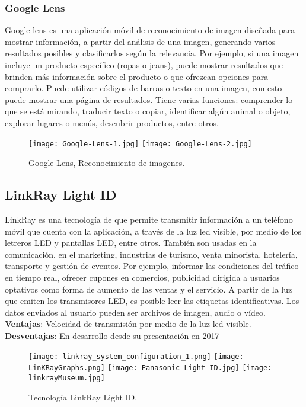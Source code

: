 \subsubsection{Google Lens}
Google lens es una aplicación móvil de reconocimiento de imagen diseñada para mostrar información, a partir del análisis de una imagen, generando varios resultados posibles y clasificarlos según la relevancia. Por ejemplo, si una imagen incluye un producto específico (ropas o jeans), puede mostrar resultados que brinden más información sobre el producto o que ofrezcan opciones para comprarlo. Puede utilizar códigos de barras o texto en una imagen, con esto puede mostrar una página de resultados. Tiene varias funciones: comprender lo que se está mirando, traducir texto o copiar, identificar algún animal o objeto, explorar lugares o menús, descubrir productos, entre otros.\cite{lens.google2021}
\begin{figure} 	
	\texttt{[image: Google-Lens-1.jpg]}
	\texttt{[image: Google-Lens-2.jpg]}
	\caption{Google Lens, Reconocimiento de imagenes.}
	\label{fig:Irecog3}
\end{figure}


\subsection{LinkRay Light ID}

LinkRay es una tecnología de que permite transmitir información a un teléfono móvil que cuenta con la aplicación, a través de la luz led visible, por medio de los letreros LED y pantallas LED, entre otros. También son usadas en la comunicación, en el marketing, industrias de turismo, venta minorista, hotelería, transporte y gestión de eventos. Por ejemplo, informar las condiciones del tráfico en tiempo real, ofrecer cupones en comercios, publicidad dirigida a usuarios optativos como forma de aumento de las ventas y el servicio.
A partir de la luz que emiten los transmisores LED, es posible leer las etiquetas identificativas. Los datos enviados al usuario pueden ser archivos de imagen, audio o vídeo. \cite{Business2017}
\\
\textbf{Ventajas}: Velocidad de transmisión por medio de la luz led visible.\cite{Business2017}
\\
\textbf{Desventajas}: En desarrollo desde su presentación en 2017\cite{Business2017}

\begin{figure} 	
	\texttt{[image: linkray\_system\_configuration\_1.png]}
	\texttt{[image: LinKRayGraphs.png]}
	\texttt{[image: Panasonic-Light-ID.jpg]}
	\texttt{[image: linkrayMuseum.jpg]}
	\caption{Tecnología LinkRay Light ID.}
	\label{fig:linkray}
\end{figure}


